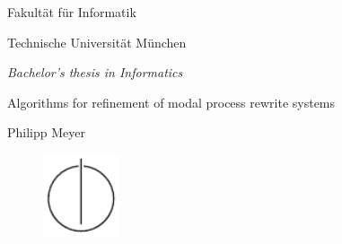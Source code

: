 \thispagestyle{empty}
\begin{titlepage}
  \begin{center}
    \begin{figure}[htp]
      \centering
      \oTUM{6cm}
    \end{figure}

    \vspace*{2\baselineskip}
    
    {\large{\scfont Fakultät für Informatik}}
    
    {\large {\scfont Technische Universität München}}
    
    \vspace{1.5cm}
    
    {\large \em Bachelor's thesis in Informatics}

    { \huge Algorithms for refinement of modal process rewrite systems}

    \vspace{2.5cm}
    
    \large{ Philipp Meyer}
    
    \vspace{3.0cm}
    
    \begin{figure}[htp]
      \centering
      \includegraphics[width=0.20\textwidth]{IN_schwarz_CMYK.pdf}
    \end{figure}
  
  \end{center}
\end{titlepage}

